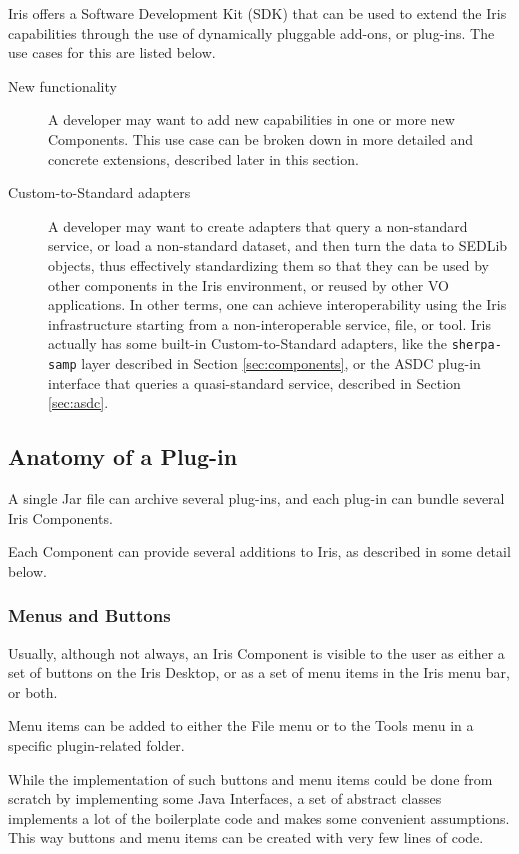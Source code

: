 \documentclass[preprint,authoryear,5p]{elsarticle}
\begin{document}
Iris offers a Software Development Kit (SDK) that can be used to extend the Iris
capabilities through the use of dynamically pluggable add-ons, or plug-ins.  The
use cases for this are listed below.
\begin{description} \item[New
functionality] A developer may want to add new capabilities in one or
more new Components. This use case can be broken down in more detailed and
concrete extensions, described later in this section.  \item[Custom-to-Standard
adapters] A developer may want to create adapters that query a non-standard
service, or load a non-standard dataset, and then turn the data to SEDLib
objects, thus effectively standardizing them so that they can be used by other
components in the Iris environment, or reused by other VO applications. In other
terms, one can achieve interoperability using the Iris infrastructure starting
from a non-interoperable service, file, or tool. Iris actually has some built-in
Custom-to-Standard adapters, like the \verb|sherpa-samp| layer described in Section
\ref{sec:components}, or the ASDC plug-in interface that queries a
quasi-standard service, described in Section \ref{sec:asdc}.  \end{description}

\subsection{Anatomy of a Plug-in} A single Jar file can archive several
plug-ins, and each plug-in can bundle several Iris Components.

Each Component can provide several additions to Iris, as described in some
detail below.

\subsubsection{Menus and Buttons} Usually, although not always, an Iris
Component is visible to the user as either a set of buttons on the Iris Desktop,
or as a set of menu items in the Iris menu bar, or both.

Menu items can be added to either the File menu or to the Tools menu in a
specific plugin-related folder.

While the implementation of such buttons and menu items could be done from
scratch by implementing some Java Interfaces, a set of abstract classes
implements a lot of the boilerplate code and makes some convenient assumptions.
This way buttons and menu items can be created with very few lines of code.
\end{document}
